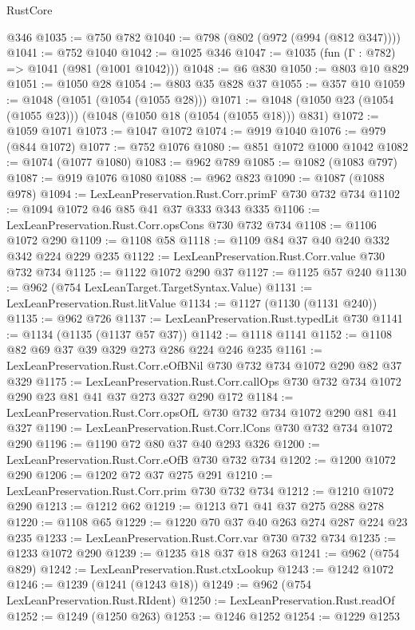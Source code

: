 \begin{lexlean}{RustCore}
\begin{coremodule}
    @346
@1035 := @750 @782
@1040 := @798 (@802 (@972 (@994 (@812 @347))))
@1041 := @752 @1040
@1042 := @1025 @346
@1047 := @1035 (fun (Γ : @782) => @1041 (@981 (@1001 @1042)))
@1048 := @6 @830
@1050 := @803 @10 @829
@1051 := @1050 @28
@1054 := @803 @35 @828 @37
@1055 := @357 @10
@1059 := @1048 (@1051 (@1054 (@1055 @28)))
@1071 := @1048 (@1050 @23 (@1054 (@1055 @23))) (@1048 (@1050 @18 (@1054 (@1055 @18))) @831)
@1072 := @1059 @1071
@1073 := @1047 @1072
@1074 := @919 @1040
@1076 := @979 (@844 @1072)
@1077 := @752 @1076
@1080 := @851 @1072 @1000 @1042
@1082 := @1074 (@1077 @1080)
@1083 := @962 @789
@1085 := @1082 (@1083 @797)
@1087 := @919 @1076 @1080
@1088 := @962 @823
@1090 := @1087 (@1088 @978)
@1094 := LexLeanPreservation.Rust.Corr.primF @730 @732 @734
@1102 := @1094 @1072 @46 @85 @41 @37 @333 @343 @335
@1106 := LexLeanPreservation.Rust.Corr.opsCons @730 @732 @734
@1108 := @1106 @1072 @290
@1109 := @1108 @58
@1118 := @1109 @84 @37 @40 @240 @332 @342 @224 @229 @235
@1122 := LexLeanPreservation.Rust.Corr.value @730 @732 @734
@1125 := @1122 @1072 @290 @37
@1127 := @1125 @57 @240
@1130 := @962 (@754 LexLeanTarget.TargetSyntax.Value)
@1131 := LexLeanPreservation.Rust.litValue
@1134 := @1127 (@1130 (@1131 @240))
@1135 := @962 @726
@1137 := LexLeanPreservation.Rust.typedLit @730
@1141 := @1134 (@1135 (@1137 @57 @37))
@1142 := @1118 @1141
@1152 := @1108 @82 @69 @37 @39 @329 @273 @286 @224 @246 @235
@1161 := LexLeanPreservation.Rust.Corr.eOfBNil @730 @732 @734 @1072 @290 @82 @37 @329
@1175 := LexLeanPreservation.Rust.Corr.callOps
    @730
    @732
    @734
    @1072
    @290
    @23
    @81
    @41
    @37
    @273
    @327
    @290
    @172
@1184 := LexLeanPreservation.Rust.Corr.opsOfL @730 @732 @734 @1072 @290 @81 @41 @327
@1190 := LexLeanPreservation.Rust.Corr.lCons @730 @732 @734 @1072 @290
@1196 := @1190 @72 @80 @37 @40 @293 @326
@1200 := LexLeanPreservation.Rust.Corr.eOfB @730 @732 @734
@1202 := @1200 @1072 @290
@1206 := @1202 @72 @37 @275 @291
@1210 := LexLeanPreservation.Rust.Corr.prim @730 @732 @734
@1212 := @1210 @1072 @290
@1213 := @1212 @62
@1219 := @1213 @71 @41 @37 @275 @288 @278
@1220 := @1108 @65
@1229 := @1220 @70 @37 @40 @263 @274 @287 @224 @23 @235
@1233 := LexLeanPreservation.Rust.Corr.var @730 @732 @734
@1235 := @1233 @1072 @290
@1239 := @1235 @18 @37 @18 @263
@1241 := @962 (@754 @829)
@1242 := LexLeanPreservation.Rust.ctxLookup
@1243 := @1242 @1072
@1246 := @1239 (@1241 (@1243 @18))
@1249 := @962 (@754 LexLeanPreservation.Rust.RIdent)
@1250 := LexLeanPreservation.Rust.readOf
@1252 := @1249 (@1250 @263)
@1253 := @1246 @1252
@1254 := @1229 @1253

\end{coremodule}
\end{lexlean}
